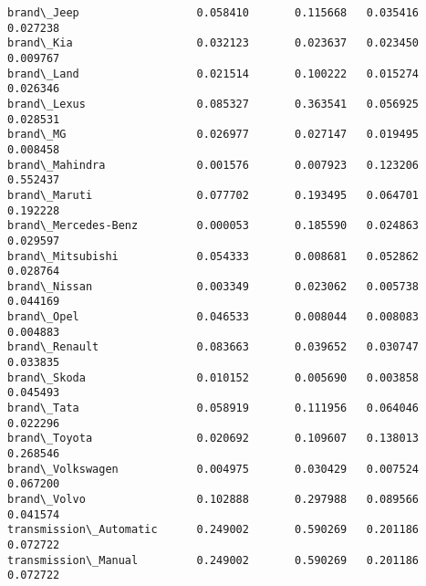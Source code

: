 \documentclass[11pt]{article}
\begin{document}
\begin{tcolorbox}[breakable, size=fbox, boxrule=.5pt, pad at break*=1mm, opacityfill=0]
\begin{Verbatim}[commandchars=\\\{\}]
brand\_Jeep                  0.058410       0.115668   0.035416  0.027238
brand\_Kia                   0.032123       0.023637   0.023450  0.009767
brand\_Land                  0.021514       0.100222   0.015274  0.026346
brand\_Lexus                 0.085327       0.363541   0.056925  0.028531
brand\_MG                    0.026977       0.027147   0.019495  0.008458
brand\_Mahindra              0.001576       0.007923   0.123206  0.552437
brand\_Maruti                0.077702       0.193495   0.064701  0.192228
brand\_Mercedes-Benz         0.000053       0.185590   0.024863  0.029597
brand\_Mitsubishi            0.054333       0.008681   0.052862  0.028764
brand\_Nissan                0.003349       0.023062   0.005738  0.044169
brand\_Opel                  0.046533       0.008044   0.008083  0.004883
brand\_Renault               0.083663       0.039652   0.030747  0.033835
brand\_Skoda                 0.010152       0.005690   0.003858  0.045493
brand\_Tata                  0.058919       0.111956   0.064046  0.022296
brand\_Toyota                0.020692       0.109607   0.138013  0.268546
brand\_Volkswagen            0.004975       0.030429   0.007524  0.067200
brand\_Volvo                 0.102888       0.297988   0.089566  0.041574
transmission\_Automatic      0.249002       0.590269   0.201186  0.072722
transmission\_Manual         0.249002       0.590269   0.201186  0.072722


\end{Verbatim}
\end{tcolorbox}
\end{document}
